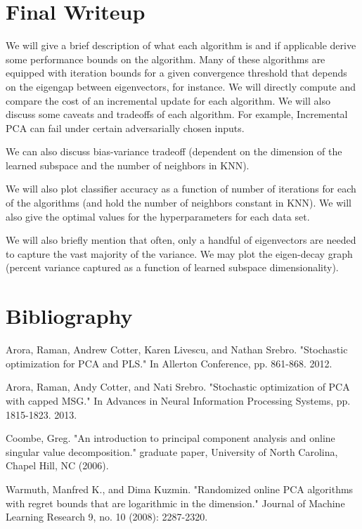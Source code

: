 \documentclass[11pt]{article}
\begin{document}
\section{Final Writeup}
We will give a brief description of what each algorithm is and if applicable derive some performance bounds on the algorithm. Many of these algorithms are equipped with iteration bounds for a given convergence threshold that depends on the eigengap between eigenvectors, for instance. We will directly compute and compare the cost of an incremental update for each algorithm. We will also discuss some caveats and tradeoffs of each algorithm. For example, Incremental PCA can fail under certain adversarially chosen inputs. 

We can also discuss bias-variance tradeoff (dependent on the dimension of the learned subspace and the number of neighbors in KNN). 

We will also plot classifier accuracy as a function of number of iterations for each of the algorithms (and hold the number of neighbors constant in KNN). We will also give the optimal values for the hyperparameters for each data set. 

We will also briefly mention that often, only a handful of eigenvectors are needed to capture the vast majority of the variance. We may plot the eigen-decay graph (percent variance captured as a function of learned subspace dimensionality). 



\section{Bibliography}
Arora, Raman, Andrew Cotter, Karen Livescu, and Nathan Srebro. "Stochastic optimization for PCA and PLS." In Allerton Conference, pp. 861-868. 2012.

Arora, Raman, Andy Cotter, and Nati Srebro. "Stochastic optimization of PCA with capped MSG." In Advances in Neural Information Processing Systems, pp. 1815-1823. 2013.

Coombe, Greg. "An introduction to principal component analysis and online singular value decomposition." graduate paper, University of North Carolina, Chapel Hill, NC (2006).

Warmuth, Manfred K., and Dima Kuzmin. "Randomized online PCA algorithms with regret bounds that are logarithmic in the dimension." Journal of Machine Learning Research 9, no. 10 (2008): 2287-2320.
\end{document}
